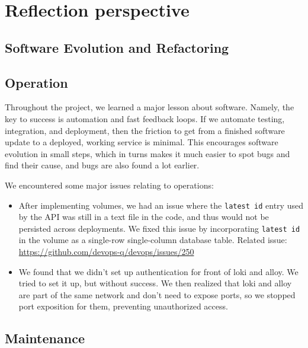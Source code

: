 \section{Reflection perspective} \label{rp}
\subsection{Software Evolution and Refactoring} %
\subsection{Operation} %
Throughout the project, we learned a major lesson about software. Namely, the key to success is automation and fast feedback loops. If we automate testing, integration, and deployment, then the friction to get from a finished software update to a deployed, working service is minimal. This encourages software evolution in small steps, which in turns makes it much easier to spot bugs and find their cause, and bugs are also found a lot earlier.

We encountered some major issues relating to operations:
\begin{itemize}
    \item After implementing volumes, we had an issue where the \texttt{latest id}
    entry used by the API was still in a text file in the code, and thus would
    not be persisted across deployments. We fixed this issue by incorporating
    \texttt{latest id} in the volume as a single-row single-column database
    table. Related issue: \url{https://github.com/devops-q/devops/issues/250}
    \item We found that we didn’t set up authentication for front of loki
    and alloy. We tried to set it up, but without success. We then realized 
    that loki and alloy are part of the same network and don’t need to expose ports,
    so we stopped port exposition for them, preventing unauthorized access.
\end{itemize}

\subsection{Maintenance} %




